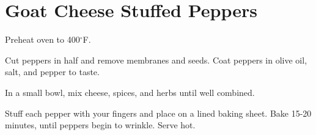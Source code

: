 \section{Goat Cheese Stuffed Peppers}
\begin{recipe}



	Preheat oven to 400$^{\circ}$F.

	Cut peppers in half and remove membranes and seeds. Coat peppers in olive oil, salt, and pepper to taste.

	In a small bowl, mix cheese, spices, and herbs until well combined.

	Stuff each pepper with your fingers and place on a lined baking sheet. Bake 15-20 minutes, until peppers begin to wrinkle. Serve hot.

\end{recipe}
